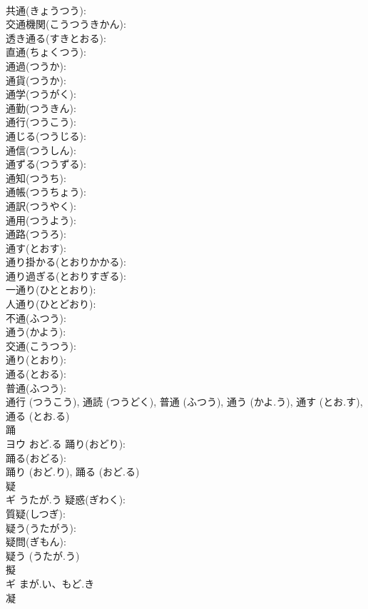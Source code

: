 \documentclass[8pt]{extreport}
\begin{document}
\begin{CJK}{UTF8}{min}
\\	共通(きょうつう): 
\\	交通機関(こうつうきかん): 
\\	透き通る(すきとおる): 
\\	直通(ちょくつう): 
\\	通過(つうか): 
\\	通貨(つうか): 
\\	通学(つうがく): 
\\	通勤(つうきん): 
\\	通行(つうこう): 
\\	通じる(つうじる): 
\\	通信(つうしん): 
\\	通ずる(つうずる): 
\\	通知(つうち): 
\\	通帳(つうちょう): 
\\	通訳(つうやく): 
\\	通用(つうよう): 
\\	通路(つうろ): 
\\	通す(とおす): 
\\	通り掛かる(とおりかかる): 
\\	通り過ぎる(とおりすぎる): 
\\	一通り(ひととおり): 
\\	人通り(ひとどおり): 
\\	不通(ふつう): 
\\	通う(かよう): 
\\	交通(こうつう): 
\\	通り(とおり): 
\\	通る(とおる): 
\\	普通(ふつう): 
\\	通行 (つうこう), 通読 (つうどく), 普通 (ふつう), 通う (かよ.う), 通す (とお.す), 通る (とお.る)
\\	踊			
\\	ヨウ	おど.る	踊り(おどり): 
\\	踊る(おどる): 
\\	踊り (おど.り), 踊る (おど.る)
\\	疑			
\\	ギ	うたが.う	疑惑(ぎわく): 
\\	質疑(しつぎ): 
\\	疑う(うたがう): 
\\	疑問(ぎもん): 
\\	疑う (うたが.う)
\\	擬			
\\	ギ	まが.い、もど.き		
\\	凝			

\end{CJK}
\end{document}
